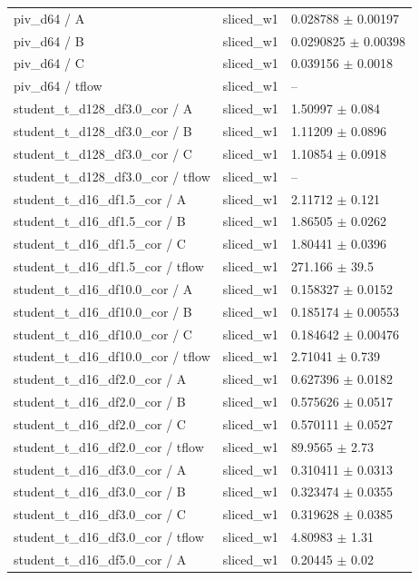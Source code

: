 \begin{tabular}{lll}
piv\_d64 / A & sliced\_w1 & 0.028788 $\pm$ 0.00197 \\
piv\_d64 / B & sliced\_w1 & 0.0290825 $\pm$ 0.00398 \\
piv\_d64 / C & sliced\_w1 & 0.039156 $\pm$ 0.0018 \\
piv\_d64 / tflow & sliced\_w1 & -- \\
student\_t\_d128\_df3.0\_cor / A & sliced\_w1 & 1.50997 $\pm$ 0.084 \\
student\_t\_d128\_df3.0\_cor / B & sliced\_w1 & 1.11209 $\pm$ 0.0896 \\
student\_t\_d128\_df3.0\_cor / C & sliced\_w1 & 1.10854 $\pm$ 0.0918 \\
student\_t\_d128\_df3.0\_cor / tflow & sliced\_w1 & -- \\
student\_t\_d16\_df1.5\_cor / A & sliced\_w1 & 2.11712 $\pm$ 0.121 \\
student\_t\_d16\_df1.5\_cor / B & sliced\_w1 & 1.86505 $\pm$ 0.0262 \\
student\_t\_d16\_df1.5\_cor / C & sliced\_w1 & 1.80441 $\pm$ 0.0396 \\
student\_t\_d16\_df1.5\_cor / tflow & sliced\_w1 & 271.166 $\pm$ 39.5 \\
student\_t\_d16\_df10.0\_cor / A & sliced\_w1 & 0.158327 $\pm$ 0.0152 \\
student\_t\_d16\_df10.0\_cor / B & sliced\_w1 & 0.185174 $\pm$ 0.00553 \\
student\_t\_d16\_df10.0\_cor / C & sliced\_w1 & 0.184642 $\pm$ 0.00476 \\
student\_t\_d16\_df10.0\_cor / tflow & sliced\_w1 & 2.71041 $\pm$ 0.739 \\
student\_t\_d16\_df2.0\_cor / A & sliced\_w1 & 0.627396 $\pm$ 0.0182 \\
student\_t\_d16\_df2.0\_cor / B & sliced\_w1 & 0.575626 $\pm$ 0.0517 \\
student\_t\_d16\_df2.0\_cor / C & sliced\_w1 & 0.570111 $\pm$ 0.0527 \\
student\_t\_d16\_df2.0\_cor / tflow & sliced\_w1 & 89.9565 $\pm$ 2.73 \\
student\_t\_d16\_df3.0\_cor / A & sliced\_w1 & 0.310411 $\pm$ 0.0313 \\
student\_t\_d16\_df3.0\_cor / B & sliced\_w1 & 0.323474 $\pm$ 0.0355 \\
student\_t\_d16\_df3.0\_cor / C & sliced\_w1 & 0.319628 $\pm$ 0.0385 \\
student\_t\_d16\_df3.0\_cor / tflow & sliced\_w1 & 4.80983 $\pm$ 1.31 \\
student\_t\_d16\_df5.0\_cor / A & sliced\_w1 & 0.20445 $\pm$ 0.02 \\

\end{tabular}

